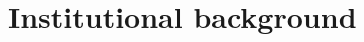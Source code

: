 \documentclass[../main.tex]{subfiles}
\begin{document}
\section{Institutional background}
\label{sec:institutional_background}

\lipsum[1-2]
\end{document}
